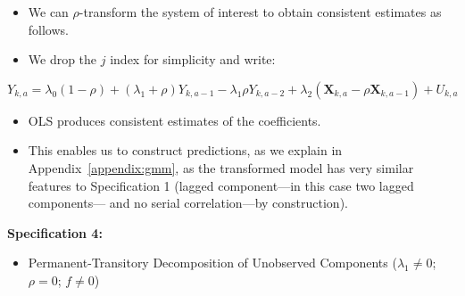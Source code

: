 \documentclass[static]{JJH-Beamer}
\begin{document}
\begin{frame}

\begin{itemize}
\item We can $\rho$-transform the system of interest to obtain consistent estimates as follows.
\item We drop the $j$ index for simplicity and write:
\end{itemize}

\begin{equation}
Y_{k,a} = \lambda_{0} \left( 1 - \rho \right) + \left( \lambda_{1} + \rho \right) Y_{k,a-1} - \lambda_{1} \rho Y_{k,a-2} + \lambda_{2} \left( \bm{X}_{k,a} - \rho \bm{X}_{k,a-1}  \right) + U_{k,a} \label{eq:rhotransform}
\end{equation}

\begin{itemize}
\item OLS produces consistent estimates of the coefficients.
\item This enables us to construct predictions, as we explain in Appendix~\ref{appendix:gmm}, as the transformed model has very similar features to Specification 1 (lagged component---in this case two lagged components--- and no serial correlation---by construction).
\end{itemize}

\end{frame}

\begin{frame}

\textbf{Specification 4:}

\begin{itemize}
\item Permanent-Transitory Decomposition of Unobserved Components ($\lambda_{1} \neq 0$; $\rho = 0$; $f \neq 0$)
\end{itemize}

\end{frame}
\end{document}
